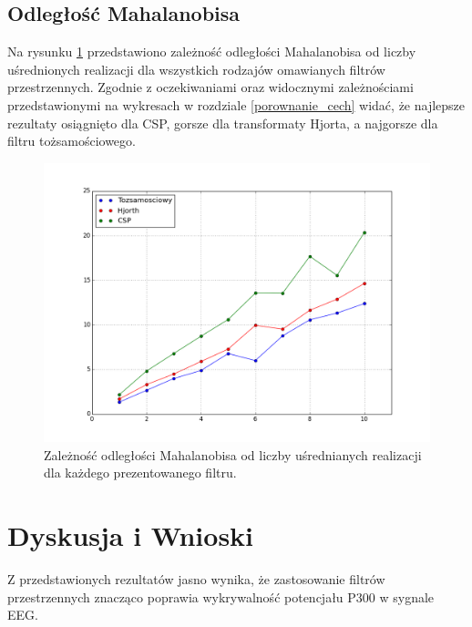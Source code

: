 \documentclass[licencjacka,openright]{pracamgr}
\begin{document}
\section{Odległość Mahalanobisa}
Na rysunku \ref{mahalanobis_pic} przedstawiono zależność odległości Mahalanobisa od liczby uśrednionych realizacji dla wszystkich rodzajów omawianych filtrów przestrzennych. Zgodnie z oczekiwaniami oraz widocznymi zależnościami przedstawionymi na wykresach w rozdziale \ref{porownanie_cech} widać, że najlepsze rezultaty osiągnięto dla CSP, gorsze dla transformaty Hjorta, a najgorsze dla filtru tożsamościowego. 



\begin{figure}[H]
\centering
\includegraphics[scale=0.6, trim=10mm 15mm 10mm 18mm, clip=True]{pics/mahalanobis.png}
\caption{Zależność odległości Mahalanobisa od liczby uśrednianych realizacji dla każdego prezentowanego filtru.}
\label{mahalanobis_pic}
\end{figure}


\chapter{Dyskusja i Wnioski}

Z przedstawionych rezultatów jasno wynika, że zastosowanie filtrów przestrzennych znacząco poprawia wykrywalność potencjału P300 w sygnale EEG. 






\end{document}
